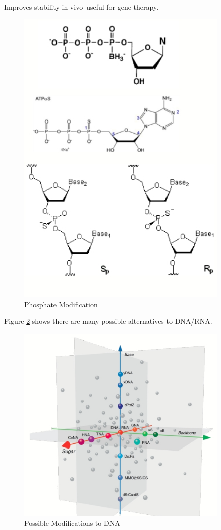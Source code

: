 \documentclass[]{article}
\begin{document}
Improves stability in vivo--useful for gene therapy.

\begin{figure}[H]
	\caption{Phosphate Modification} \label{fig:PhosphateModification} 
	\includegraphics[width=0.9\textwidth]{PhosphateModification}
\end{figure}

Figure \ref{fig:PossibleModifications} shows there are many possible alternatives to DNA/RNA.
\begin{figure}[H]
	\caption{Possible Modifications to DNA} \label{fig:PossibleModifications} 
	\includegraphics[width=0.9\textwidth]{PossibleModifications}
\end{figure}
\end{document}
